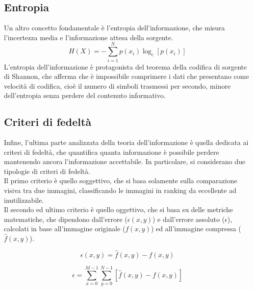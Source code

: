\subsection{Entropia}
Un altro concetto fondamentale è l'entropia dell'informazione, che misura l'incertezza media e l'informazione attesa della sorgente.
\begin{equation*}
    H(X)=-\sum_{i=1}^{N}p(x_i)\log_{c}{[p(x_i)]}
\end{equation*}
L'entropia dell'informazione è protagonista del teorema della codifica di sorgente di Shannon, che afferma che è impossibile comprimere i dati
che presentano come velocità di codifica, cioè il numero di simboli trasmessi per secondo, minore dell'entropia senza perdere del contenuto informativo.
\subsection{Criteri di fedeltà}
Infine, l'ultima parte analizzata della teoria dell'informazione è quella dedicata ai criteri di fedeltà, che quantifica quanta informazione è possibile
perdere mantenendo ancora l'informazione accettabile. In particolare, si considerano due tipologie di criteri di fedeltà.\\
Il primo criterio è quello soggettivo, che si basa solamente sulla comparazione visiva tra due immagini, classificando le immagini in ranking da eccellente ad inutilizzabile.\\
Il secondo ed ultimo criterio è quello oggettivo, che si basa su delle metriche matematiche, che dipendono dall'errore ($\epsilon(x,y)$) e dall'errore assoluto ($\epsilon$),
calcolati in base all'immagine originale ($f(x,y)$) ed all'immagine compressa ($\hat{f}(x,y)$).
\begin{center}
\begin{minipage}{0.48\textwidth} %
    \centering
    \begin{equation*}
        \epsilon(x,y) = \hat{f}(x,y)-f(x,y)
    \end{equation*}
\end{minipage}
\hfill %
\begin{minipage}{0.48\textwidth} %
    \centering
    \begin{equation*}
        \epsilon = \sum_{x=0}^{M-1}\sum_{y=0}^{N-1}\left[\hat{f}(x,y)-f(x,y)\right]
    \end{equation*}
\end{minipage}
\end{center}
